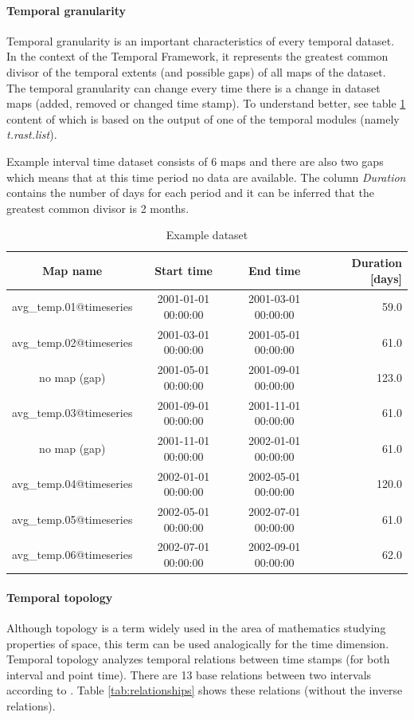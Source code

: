 \documentclass[a4paper,12pt]{book}
\newcommand{\module}[1]{\textsl{#1}}
\newcommand{\tf}{Temporal Framework\xspace}
\begin{document}
\paragraph{Temporal granularity}
\label{sec:temporalGranularity}
Temporal granularity is an important characteristics of every temporal dataset.
In the context of the \tf , it represents the greatest common divisor
of the temporal extents (and possible gaps) of all maps of the dataset.
The temporal granularity can change every time there is a change in dataset maps
(added, removed or changed time stamp).
To understand better, see table \ref{tab:granularity} content of which is based on the output
of one of the temporal modules (namely \module{t.rast.list}).

Example interval time dataset consists of 6 maps and
there are also two gaps which means that at this time period no data are available.
The column \emph{Duration} contains the number of days for each period and it can be inferred
that the greatest common divisor is 2 months.
\begin{table}[ht!]
  \centering
  \caption{Example dataset}
  \label{tab:granularity}
\setlength{\extrarowheight}{3pt}
\begin{tabular}{cccr}
\toprule
 Map name & Start time & End time & Duration [days]\\\midrule
avg\_temp.01@timeseries &    2001-01-01 00:00:00  &   2001-03-01 00:00:00  &   59.0\\
avg\_temp.02@timeseries  &  2001-03-01 00:00:00  &   2001-05-01 00:00:00   &  61.0\\
no map (gap)    &  2001-05-01 00:00:00    & 2001-09-01 00:00:00   &  123.0\\
avg\_temp.03@timeseries     & 2001-09-01 00:00:00   &  2001-11-01 00:00:00  &   61.0\\
no map (gap) &   2001-11-01 00:00:00   &  2002-01-01 00:00:00  &   61.0 \\
avg\_temp.04@timeseries  &    2002-01-01 00:00:00   &  2002-05-01 00:00:00     & 120.0 \\
avg\_temp.05@timeseries  &      2002-05-01 00:00:00 &    2002-07-01 00:00:00 &    61.0 \\
avg\_temp.06@timeseries &     2002-07-01 00:00:00  &   2002-09-01 00:00:00   &  62.0\\
\bottomrule
\end{tabular}
\end{table}


\paragraph{Temporal topology}
\label{sec:temporalTopology}
Although topology is a term widely used in the area of mathematics studying properties of space,
this term can be used analogically for the time dimension.
Temporal topology analyzes temporal relations between time stamps (for both interval and point time).
There are 13 base relations between two intervals according to \cite{relationships}.
Table \ref{tab:relationships} shows these relations (without the inverse relations).
\end{document}
